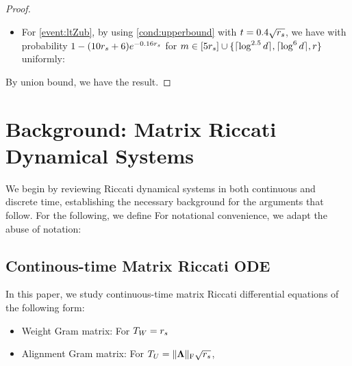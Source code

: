 \begin{proof}
\begin{itemize}[leftmargin=*]
\item  For   \ref{event:ltZub},  by using  \ref{cond:upperbound}  with $t = 0.4 \sqrt{r_s}$, we have with probability $1 -  (10 r_s + 6) e^{-0.16 r_s}$ for $m \in [5r_s] \cup \{\lceil\log^{2.5} d\rceil ,\lceil\log^{6} d\rceil, r \}$ uniformly:
\end{itemize}
By union bound, we have the result.
 \end{proof}


 

\section{Background: Matrix Riccati Dynamical Systems}
\label{app:background}
We begin by reviewing Riccati dynamical systems in both continuous and discrete time, establishing the necessary background for the arguments that follow. For the following, we define
For notational convenience,     we adapt the abuse of notation:
\subsection{Continous-time Matrix Riccati ODE}
In this paper, we study continuous-time matrix Riccati differential equations of the following form:
\begin{itemize}[leftmargin=*]
\item Weight Gram matrix: For  $T_W = r_s$
\item   Alignment Gram matrix:  For $T_U = \lVert\boldsymbol{\Lambda}\rVert_\mathrm{F} \sqrt{r_s}$, 
\end{itemize}
 
